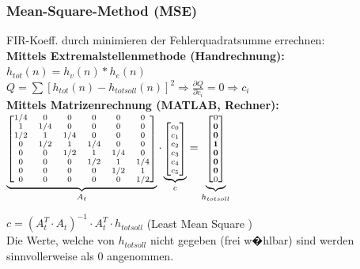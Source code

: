    \begin{minipage}{9cm}    	
        \subsubsection{Mean-Square-Method (MSE)}
        FIR-Koeff. durch minimieren der Fehlerquadratsumme errechnen:\\
				
				\textbf{Mittels Extremalstellenmethode (Handrechnung):}\\
				$h_{tot}(n)=h_v(n)*h_e(n)$\\
        $Q=\sum[h_{tot}(n)-h_{totsoll}(n)]^2 \Longrightarrow \frac{\partial Q}{\partial c_i}=0 \Longrightarrow c_i$\\
					
       \textbf{ Mittels Matrizenrechnung (MATLAB, Rechner):}\\
				$\scriptsize\underbrace{\begin{bmatrix}
				1/4&0&0&0&0&0\\
				1&1/4&0&0&0&0\\
				1/2&1&1/4&0&0&0\\
				0&1/2&1&1/4&0&0\\
				0&0&1/2&1&1/4&0\\
				0&0&0&1/2&1&1/4\\
				0&0&0&0&1/2&1\\
				0&0&0&0&0&1/2\\
				\end{bmatrix}}_{A_t}\cdot
				\underbrace{\begin{bmatrix}
				c_0\\
				c_1\\
				c_2\\
				c_3\\
				c_4\\
				c_5\\
				\end{bmatrix}}_c=
				\underbrace{\begin{bmatrix}
				0\\
				\textbf{0}\\
				\textbf{0}\\
				\textbf{1}\\
				\textbf{0}\\
				\textbf{0}\\
				\textbf{0}\\
				0\\
				\end{bmatrix}}_{h_{totsoll}}$\\
				
				\vspace{0.25cm}
				
			$c=(A_t^T\cdot A_t)^{-1}\cdot A_t^T\cdot h_{totsoll}$ (Least Mean Square )\\
			
			Die Werte, welche von $h_{totsoll}$ nicht gegeben (frei w�hlbar) sind werden sinnvollerweise als $0$ angenommen.
				
    \end{minipage}

